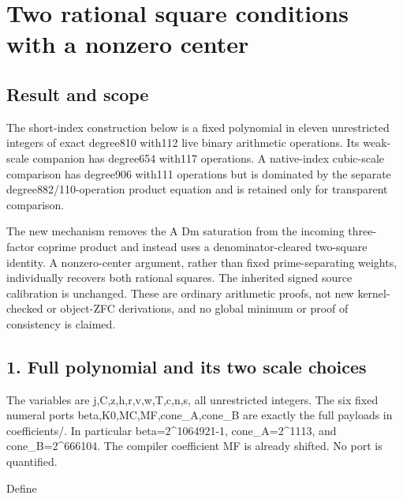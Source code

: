 \section{Two rational square conditions with a nonzero center}



\subsection{Result and scope}



The short-index construction below is a fixed polynomial in eleven unrestricted integers of exact degree810 with112 live binary arithmetic operations. Its weak-scale companion has degree654 with117 operations. A native-index cubic-scale comparison has degree906 with111 operations but is dominated by the separate degree882/\allowbreak{}110-operation product equation and is retained only for transparent comparison.



The new mechanism removes the A Dm saturation from the incoming three-factor coprime product and instead uses a denominator-cleared two-square identity. A nonzero-center argument, rather than fixed prime-separating weights, individually recovers both rational squares. The inherited signed source calibration is unchanged. These are ordinary arithmetic proofs, not new kernel-checked or object-ZFC derivations, and no global minimum or proof of consistency is claimed.



\subsection{1. Full polynomial and its two scale choices}



The variables are j,C,z,h,r,v,w,T,c,n,s, all unrestricted integers. The six fixed numeral ports beta,K0,MC,MF,cone\_\allowbreak{}A,cone\_\allowbreak{}B are exactly the full payloads in coefficients/. In particular beta=\allowbreak{}2\textasciicircum{}\allowbreak{}1064921-1, cone\_\allowbreak{}A=\allowbreak{}2\textasciicircum{}\allowbreak{}1113, and cone\_\allowbreak{}B=\allowbreak{}2\textasciicircum{}\allowbreak{}666104. The compiler coefficient MF is already shifted. No port is quantified.



Define



